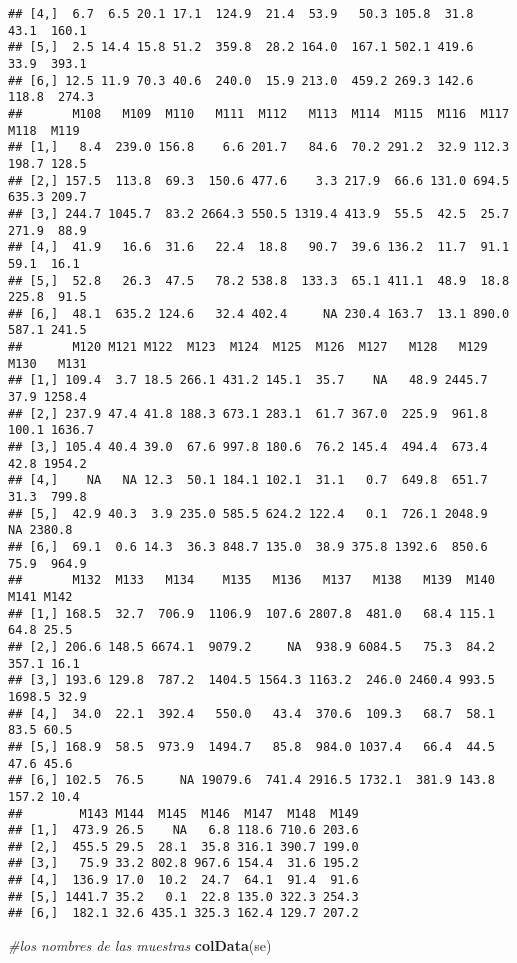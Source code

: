 \documentclass[
]{article}
\newenvironment{Shaded}{\begin{snugshade}}{\end{snugshade}}
\newcommand{\CommentTok}[1]{\textcolor[rgb]{0.56,0.35,0.01}{\textit{#1}}}
\newcommand{\FunctionTok}[1]{\textcolor[rgb]{0.13,0.29,0.53}{\textbf{#1}}}
\newcommand{\NormalTok}[1]{#1}
\begin{document}
\begin{verbatim}
## [4,]  6.7  6.5 20.1 17.1  124.9  21.4  53.9   50.3 105.8  31.8  43.1  160.1
## [5,]  2.5 14.4 15.8 51.2  359.8  28.2 164.0  167.1 502.1 419.6  33.9  393.1
## [6,] 12.5 11.9 70.3 40.6  240.0  15.9 213.0  459.2 269.3 142.6 118.8  274.3
##       M108   M109  M110   M111  M112   M113  M114  M115  M116  M117  M118  M119
## [1,]   8.4  239.0 156.8    6.6 201.7   84.6  70.2 291.2  32.9 112.3 198.7 128.5
## [2,] 157.5  113.8  69.3  150.6 477.6    3.3 217.9  66.6 131.0 694.5 635.3 209.7
## [3,] 244.7 1045.7  83.2 2664.3 550.5 1319.4 413.9  55.5  42.5  25.7 271.9  88.9
## [4,]  41.9   16.6  31.6   22.4  18.8   90.7  39.6 136.2  11.7  91.1  59.1  16.1
## [5,]  52.8   26.3  47.5   78.2 538.8  133.3  65.1 411.1  48.9  18.8 225.8  91.5
## [6,]  48.1  635.2 124.6   32.4 402.4     NA 230.4 163.7  13.1 890.0 587.1 241.5
##       M120 M121 M122  M123  M124  M125  M126  M127   M128   M129  M130   M131
## [1,] 109.4  3.7 18.5 266.1 431.2 145.1  35.7    NA   48.9 2445.7  37.9 1258.4
## [2,] 237.9 47.4 41.8 188.3 673.1 283.1  61.7 367.0  225.9  961.8 100.1 1636.7
## [3,] 105.4 40.4 39.0  67.6 997.8 180.6  76.2 145.4  494.4  673.4  42.8 1954.2
## [4,]    NA   NA 12.3  50.1 184.1 102.1  31.1   0.7  649.8  651.7  31.3  799.8
## [5,]  42.9 40.3  3.9 235.0 585.5 624.2 122.4   0.1  726.1 2048.9    NA 2380.8
## [6,]  69.1  0.6 14.3  36.3 848.7 135.0  38.9 375.8 1392.6  850.6  75.9  964.9
##       M132  M133   M134    M135   M136   M137   M138   M139  M140   M141 M142
## [1,] 168.5  32.7  706.9  1106.9  107.6 2807.8  481.0   68.4 115.1   64.8 25.5
## [2,] 206.6 148.5 6674.1  9079.2     NA  938.9 6084.5   75.3  84.2  357.1 16.1
## [3,] 193.6 129.8  787.2  1404.5 1564.3 1163.2  246.0 2460.4 993.5 1698.5 32.9
## [4,]  34.0  22.1  392.4   550.0   43.4  370.6  109.3   68.7  58.1   83.5 60.5
## [5,] 168.9  58.5  973.9  1494.7   85.8  984.0 1037.4   66.4  44.5   47.6 45.6
## [6,] 102.5  76.5     NA 19079.6  741.4 2916.5 1732.1  381.9 143.8  157.2 10.4
##        M143 M144  M145  M146  M147  M148  M149
## [1,]  473.9 26.5    NA   6.8 118.6 710.6 203.6
## [2,]  455.5 29.5  28.1  35.8 316.1 390.7 199.0
## [3,]   75.9 33.2 802.8 967.6 154.4  31.6 195.2
## [4,]  136.9 17.0  10.2  24.7  64.1  91.4  91.6
## [5,] 1441.7 35.2   0.1  22.8 135.0 322.3 254.3
## [6,]  182.1 32.6 435.1 325.3 162.4 129.7 207.2
\end{verbatim}

\begin{Shaded}
\begin{Highlighting}[]
\CommentTok{\#los nombres de las muestras}
\FunctionTok{colData}\NormalTok{(se)}
\end{Highlighting}
\end{Shaded}
\end{document}
